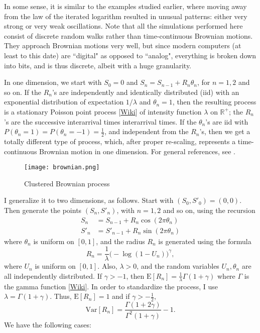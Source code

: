 \documentclass[oneside,10pt]{book}
\begin{document}
In some sense, it is similar to the examples studied earlier, where moving away from the law of the iterated logarithm resulted in unusual patterns: either very strong or very weak oscillations. Note that all the simulations performed here consist of discrete random walks rather than 
 time-continuous Brownian motions.
 They approach Brownian motions very well, but since modern computers (at least to this date) are ``digital" as opposed to ``analog", everything is broken down into bits, and is thus discrete, albeit with a huge granularity.
   
  In one dimension, we start with $S_0=0$ and $S_n=S_{n-1}+R_n\theta_n$, for $n=1,2$ and so on. If the $R_n$'s are independently and identically distributed (iid) with an exponential distribution of expectation $1/\lambda$ and $\theta_n=1$, then the resulting process is a stationary 
\textcolor{index}{Poisson point process} [\href{https://en.wikipedia.org/wiki/Poisson_point_process}{Wiki}] of 
intensity function $\lambda$ on $\mathbb{R}^{+}$; the $R_n$'s are the successive 
interarrival times \textcolor{index}{interarrival times}. If the $\theta_n$'s are iid with $P(\theta_n=1)=P(\theta_n=-1)=\frac{1}{2}$, and independent from the $R_n$'s, then we get a totally different type of process, which, after proper re-scaling, represents a time-continuous 
 \textcolor{index}{Brownian motion} in one dimension. For general references, see \cite{daleyA2002,daleyB2008}.


\begin{figure}%
\centering
\texttt{[image: brownian.png]}  
\caption{Clustered Brownian process}
\label{fig:lolbrown}
\end{figure}

I generalize it to two dimensions, as follows. Start with $(S_0,S'_0)=(0,0)$. Then generate the points $(S_n, S'_n)$, with $n=1,2$ and so on, using the recursion
\begin{align}
S_n &  =  S_{n-1}+R_n \cos(2\pi\theta_n) \label{brown10} \\
S'_n & = S'_{n-1}+ R_n\sin(2\pi\theta_n) \label{brown11}
\end{align}
where $\theta_n$ is uniform on $[0, 1]$, and the radius $R_n$ is generated using the formula
\begin{equation}
R_n=\frac{1}{\lambda}\Big(-\log(1-U_n)\Big)^\gamma, \label{gam11}
\end{equation}
where $U_n$ is uniform on $[0,1]$. Also, $\lambda>0$, and the random variables $U_n,\theta_n$ are all independently distributed. If $\gamma>-1$, then
$\mbox{E}[R_n]=\frac{1}{\lambda}\Gamma(1+\gamma)$ where $\Gamma$ is the \textcolor{index}{gamma function} 
[\href{https://en.wikipedia.org/wiki/Gamma_function}{Wiki}]. In order to standardize the process, I use
$\lambda=\Gamma(1+\gamma)$. Thus, $\mbox{E}[R_n]=1$ and if $\gamma>-\frac{1}{2}$,
$$\mbox{Var}[R_n]=\frac{\Gamma(1+2\gamma)}{\Gamma^2(1+\gamma)}-1.$$
We have the following cases:
\end{document}

